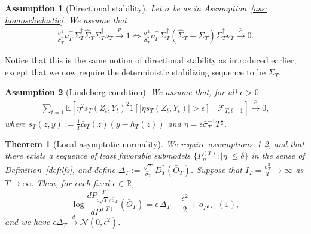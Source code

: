 \documentclass[11pt]{article}
\newtheorem{thm}{Theorem}
\newtheorem{assum}{Assumption}
\begin{document}
\begin{assum}[Directional stability]
\label{ass: lan_stability}
Let $\sigma$ be as in Assumption~\ref{ass: homoschedastic}. We assume that
    \begin{align*}
        \frac{\sigma^2}{\bar{\sigma}_T^2} \nu^\top_T \bar{\Sigma}_T^{\dag}\widehat{\Sigma}_T\bar{\Sigma}_T^{\dag}\nu_T \overset{p}{\rightarrow} 1 \iff  \frac{\sigma^2}{\bar{\sigma}_T^2} \nu^\top_T \bar{\Sigma}_T^{\dag}(\widehat{\Sigma}_T - \bar{\Sigma}_T)\bar{\Sigma}_T^{\dag}\nu_T \overset{p}{\rightarrow} 0.
    \end{align*}
\end{assum}
Notice that this is the same notion of directional stability as introduced earlier, except that we now require the deterministic stabilizing sequence to be $\bar \Sigma_T$.
\begin{assum}[Lindeberg condition]
\label{ass: conditional_lind_eff}
    We assume that, for all $\epsilon > 0$ \begin{align*}
        \sum_{t=1}\mathbb{E}\left[\eta^2 s_T(Z_t, Y_t)^2 1[|\eta s_T(Z_t, Y_t)| > \epsilon]\mid \mathcal{F}_{T,t-1}\right] \overset{p}{\rightarrow} 0,
    \end{align*}
    where $s_T(z,y) := \frac{1}{T}\bar{\alpha}_T(z)(y - h_T(z))$ and $\eta = \epsilon \bar{\sigma}_T^{-1}T^{\frac{1}{2}}$. 
\end{assum}
\begin{thm}[Local asymptotic normality]\label{thm:lan}
We require assumptions~\ref{ass: lan_stability}-\ref{ass: conditional_lind_eff}, and that there exists a sequence of least favorable submodels $\{P^{(T)}_{\eta} : |\eta|\leq \delta\}$ in the sense of
Definition~\ref{def:lfs}, and define $\Delta_T:= \frac{\sqrt{T}}{\bar\sigma_T}\,D_T^*(\bar O_T)$. Suppose that $I_T = \frac{\bar{\sigma}_T^2}{T} \to \infty$ as $T\to \infty$. Then, for each fixed $\epsilon\in\mathbb R$,
\begin{equation}
\log\frac{dP^{(T)}_{\epsilon\sqrt T/\bar \sigma_T}}{dP^{(T)}}(\bar O_T)
=
\epsilon\,\Delta_T-\frac{\epsilon^2}{2}+o_{P^{(T)}}(1),
\label{eq:lan_adaptive}
\end{equation}
and we have $\epsilon \Delta_T \overset{d}{\rightarrow} \mathcal{N}(0, \epsilon^2)$. 
\end{thm}
\end{document}

